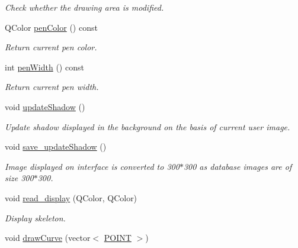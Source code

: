 \begin{DoxyCompactItemize}
\begin{DoxyCompactList}\small\item\em \-Check whether the drawing area is modified. \end{DoxyCompactList}\item 
\hypertarget{classScribbleArea_a1de2530671bd6d575a1499892e877990}{\-Q\-Color \hyperlink{classScribbleArea_a1de2530671bd6d575a1499892e877990}{pen\-Color} () const }\label{classScribbleArea_a1de2530671bd6d575a1499892e877990}

\begin{DoxyCompactList}\small\item\em \-Return current pen color. \end{DoxyCompactList}\item 
\hypertarget{classScribbleArea_a2d1b263e57b70bf645934a1ac2f4e29f}{int \hyperlink{classScribbleArea_a2d1b263e57b70bf645934a1ac2f4e29f}{pen\-Width} () const }\label{classScribbleArea_a2d1b263e57b70bf645934a1ac2f4e29f}

\begin{DoxyCompactList}\small\item\em \-Return current pen width. \end{DoxyCompactList}\item 
void \hyperlink{classScribbleArea_a24cc1cb9509dd99c9182891ead81e4fb}{update\-Shadow} ()
\begin{DoxyCompactList}\small\item\em \-Update shadow displayed in the background on the basis of current user image. \end{DoxyCompactList}\item 
\hypertarget{classScribbleArea_aa9ea1ee5280630537ce47743dc2c8ee6}{void \hyperlink{classScribbleArea_aa9ea1ee5280630537ce47743dc2c8ee6}{save\-\_\-update\-Shadow} ()}\label{classScribbleArea_aa9ea1ee5280630537ce47743dc2c8ee6}

\begin{DoxyCompactList}\small\item\em \-Image displayed on interface is converted to 300$\ast$300 as database images are of size 300$\ast$300. \end{DoxyCompactList}\item 
void \hyperlink{classScribbleArea_a11f61bfb9fa699b72fde3763ae53c03e}{read\-\_\-display} (\-Q\-Color, \-Q\-Color)
\begin{DoxyCompactList}\small\item\em \-Display skeleton. \end{DoxyCompactList}\item 
\hypertarget{classScribbleArea_a910fcc131f83dfd4f69015745d244a14}{void \hyperlink{classScribbleArea_a910fcc131f83dfd4f69015745d244a14}{draw\-Curve} (vector$<$ \hyperlink{structPOINT}{\-P\-O\-I\-N\-T} $>$)}\label{classScribbleArea_a910fcc131f83dfd4f69015745d244a14}


\end{DoxyCompactItemize}

